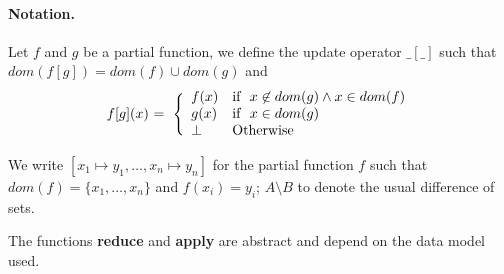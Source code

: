 \documentclass[envcountsect,runningheads,orivec]{llncs}
\begin{document}
\normalfont
\normalsize

\paragraph{Notation.} Let $f$ and $g$ be a partial function, we define the update operator $\_[\_]$ such that
  $dom(f[g])  = dom(f) \cup dom(g)$ and 
 \[
   \begin{array}{l@{\ = \ \Bigg\{}l}
     f[g](x) & 
     \begin{array}{ll}
        f(x) & \mbox{if }\ x\not\in dom(g) \wedge x\in dom(f) \\
        g(x) & \mbox{if }\ x\in dom(g)\\
        \mathit{\undefined}  & \mbox{Otherwise} 
     \end{array}
   \end{array}
 \]    

 We write $[x_1 \mapsto y_1, \ldots, x_n \mapsto y_n]$ for the partial function $f$ such that $dom(f)=\{x_1,\ldots,x_n\}$ and $f(x_i)=y_i$; $A \setminus B$ to denote the usual difference of sets.



The functions \textbf{reduce} and \textbf{apply} are abstract and depend on the data model used. 
\end{document}
